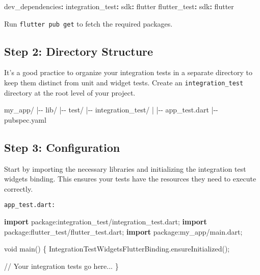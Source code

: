 \documentclass[
]{article}
\newenvironment{Shaded}{\begin{snugshade}}{\end{snugshade}}
\newcommand{\AttributeTok}[1]{\textcolor[rgb]{0.16,0.50,0.73}{#1}}
\newcommand{\CommentTok}[1]{\textcolor[rgb]{0.48,0.49,0.49}{#1}}
\newcommand{\DataTypeTok}[1]{\textcolor[rgb]{0.16,0.50,0.73}{#1}}
\newcommand{\FunctionTok}[1]{\textcolor[rgb]{0.56,0.27,0.68}{#1}}
\newcommand{\KeywordTok}[1]{\textcolor[rgb]{0.81,0.81,0.76}{\textbf{#1}}}
\newcommand{\NormalTok}[1]{\textcolor[rgb]{0.81,0.81,0.76}{#1}}
\newcommand{\OperatorTok}[1]{\textcolor[rgb]{0.81,0.81,0.76}{#1}}
\newcommand{\StringTok}[1]{\textcolor[rgb]{0.96,0.31,0.31}{#1}}
\newcommand{\VariableTok}[1]{\textcolor[rgb]{0.15,0.68,0.68}{#1}}
\begin{document}
\begin{Shaded}
\begin{Highlighting}[]
\FunctionTok{dev\_dependencies}\KeywordTok{:}
\AttributeTok{  }\FunctionTok{integration\_test}\KeywordTok{:}
\AttributeTok{    }\FunctionTok{sdk}\KeywordTok{:}\AttributeTok{ flutter}
\AttributeTok{  }\FunctionTok{flutter\_test}\KeywordTok{:}
\AttributeTok{    }\FunctionTok{sdk}\KeywordTok{:}\AttributeTok{ flutter}
\end{Highlighting}
\end{Shaded}

Run \texttt{flutter\ pub\ get} to fetch the required packages.

\subsection{Step 2: Directory
Structure}\label{step-2-directory-structure}

It's a good practice to organize your integration tests in a separate
directory to keep them distinct from unit and widget tests. Create an
\texttt{integration\_test} directory at the root level of your project.

\begin{Shaded}
\begin{Highlighting}[]
\VariableTok{my\_app}\OperatorTok{/}
\OperatorTok{|}\CommentTok{{-}{-} lib/}
\OperatorTok{|}\CommentTok{{-}{-} test/}
\OperatorTok{|}\CommentTok{{-}{-} integration\_test/}
\OperatorTok{|}   \OperatorTok{|}\CommentTok{{-}{-} app\_test.dart}
\OperatorTok{|}\CommentTok{{-}{-} pubspec.yaml}
\end{Highlighting}
\end{Shaded}

\subsection{Step 3: Configuration}\label{step-3-configuration}

Start by importing the necessary libraries and initializing the
integration test widgets binding. This ensures your tests have the
resources they need to execute correctly.

\texttt{app\_test.dart:}

\begin{Shaded}
\begin{Highlighting}[]
\KeywordTok{import} \StringTok{\textquotesingle{}package:integration\_test/integration\_test.dart\textquotesingle{}}\NormalTok{;}
\KeywordTok{import} \StringTok{\textquotesingle{}package:flutter\_test/flutter\_test.dart\textquotesingle{}}\NormalTok{;}
\KeywordTok{import} \StringTok{\textquotesingle{}package:my\_app/main.dart\textquotesingle{}}\NormalTok{;}

\DataTypeTok{void}\NormalTok{ main() }\OperatorTok{\{}
\NormalTok{  IntegrationTestWidgetsFlutterBinding}\OperatorTok{.}\NormalTok{ensureInitialized();}

  \CommentTok{// Your integration tests go here...}
\OperatorTok{\}}
\end{Highlighting}
\end{Shaded}
\end{document}
